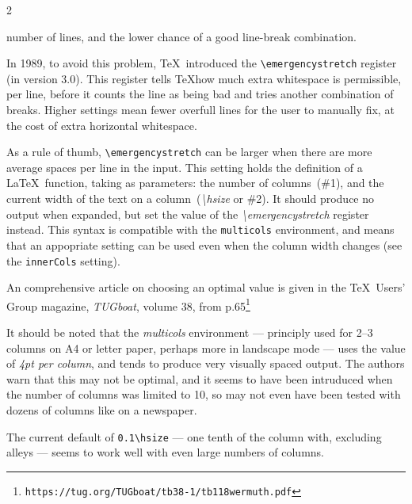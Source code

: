 \documentclass[a4paper,DIV=11]{scrartcl}
\begin{document}
\begin{multicols}{2}
{  number of lines, and the lower chance of a good line-break
  combination.\par
  In 1989, to avoid this problem, \TeX\ introduced the
  \texttt{\textbackslash emergencystretch}
  register (in version 3.0). This register tells \TeX how much extra
  whitespace is permissible, per line, before it counts the line as
  being bad and tries another combination of breaks. Higher settings
  mean fewer overfull lines for the user to manually fix, at the cost
  of extra horizontal whitespace.\par
  As a rule of thumb, \texttt{\textbackslash emergencystretch} can be
  larger when there are more average spaces per line in the input.
  This setting holds the definition of a \LaTeX\ function, taking as
  parameters: the number of columns~(\#1), and the current width of
  the text on a column~(\textit{\textbackslash hsize} or \#2). It
  should produce no output when expanded, but set the value of the
  \textit{\textbackslash emergencystretch} register instead. This
  syntax is compatible with the \texttt{multicols} environment, and
  means that an appopriate setting can be used even when the column
  width changes (see the \texttt{innerCols} setting).\par
  An comprehensive article on choosing an optimal value is given in the
  \TeX\ Users' Group magazine, \textit{TUGboat}, volume 38, from p.65\footnote{
  \texttt{https://tug.org/TUGboat/tb38-1/tb118wermuth.pdf}} \par
  It should be noted that the \textit{multicols} environment ---
  principly used for 2--3 columns on A4 or letter paper, perhaps more
  in landscape mode --- uses the value of \textit{4pt per column}, and
  tends to produce very visually spaced output. The authors warn that
  this may not be optimal, and it seems to have been intruduced when
  the number of columns was limited to 10, so may not even have been
  tested with dozens of columns like on a newspaper.
  \par
  The current default of \texttt{0.1\textbackslash hsize} --- one
  tenth of the column with, excluding alleys --- seems to
  work well with even large numbers of columns.
}
\end{multicols}
\end{document}
